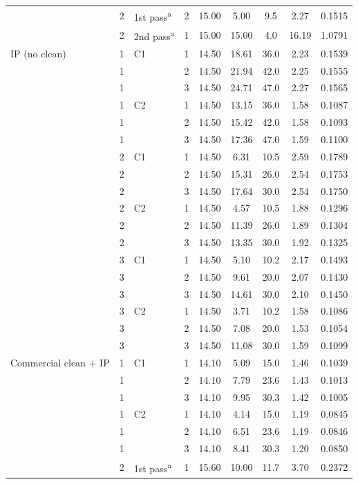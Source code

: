 {\begin{longtable}{>{\raggedright\arraybackslash}p{2.2cm}llcccccc}
    \addlinespace[2pt]
     & 2 & 1st pass\textsuperscript{a} & 2 & 15.00 & 5.00 & 9.5 & 2.27 & 0.1515 \\
    \addlinespace[2pt]
     & 2 & 2nd pass\textsuperscript{a} & 1 & 15.00 & 15.00 & 4.0 & 16.19 & 1.0791 \\
    \midrule
    IP (no clean) & 1 & C1 & 1 & 14.50 & 18.61 & 36.0 & 2.23 & 0.1539 \\
     & 1 &  & 2 & 14.50 & 21.94 & 42.0 & 2.25 & 0.1555 \\
     & 1 &  & 3 & 14.50 & 24.71 & 47.0 & 2.27 & 0.1565 \\
    \addlinespace[2pt]
     & 1 & C2 & 1 & 14.50 & 13.15 & 36.0 & 1.58 & 0.1087 \\
     & 1 &  & 2 & 14.50 & 15.42 & 42.0 & 1.58 & 0.1093 \\
     & 1 &  & 3 & 14.50 & 17.36 & 47.0 & 1.59 & 0.1100 \\
    \addlinespace[2pt]
     & 2 & C1 & 1 & 14.50 & 6.31 & 10.5 & 2.59 & 0.1789 \\
     & 2 &  & 2 & 14.50 & 15.31 & 26.0 & 2.54 & 0.1753 \\
     & 2 &  & 3 & 14.50 & 17.64 & 30.0 & 2.54 & 0.1750 \\
    \addlinespace[2pt]
     & 2 & C2 & 1 & 14.50 & 4.57 & 10.5 & 1.88 & 0.1296 \\
     & 2 &  & 2 & 14.50 & 11.39 & 26.0 & 1.89 & 0.1304 \\
     & 2 &  & 3 & 14.50 & 13.35 & 30.0 & 1.92 & 0.1325 \\
    \addlinespace[2pt]
     & 3 & C1 & 1 & 14.50 & 5.10 & 10.2 & 2.17 & 0.1493 \\
     & 3 &  & 2 & 14.50 & 9.61 & 20.0 & 2.07 & 0.1430 \\
     & 3 &  & 3 & 14.50 & 14.61 & 30.0 & 2.10 & 0.1450 \\
    \addlinespace[2pt]
     & 3 & C2 & 1 & 14.50 & 3.71 & 10.2 & 1.58 & 0.1086 \\
     & 3 &  & 2 & 14.50 & 7.08 & 20.0 & 1.53 & 0.1054 \\
     & 3 &  & 3 & 14.50 & 11.08 & 30.0 & 1.59 & 0.1099 \\
    \midrule
    Commercial clean + IP & 1 & C1 & 1 & 14.10 & 5.09 & 15.0 & 1.46 & 0.1039 \\
     & 1 &  & 2 & 14.10 & 7.79 & 23.6 & 1.43 & 0.1013 \\
     & 1 &  & 3 & 14.10 & 9.95 & 30.3 & 1.42 & 0.1005 \\
    \addlinespace[2pt]
     & 1 & C2 & 1 & 14.10 & 4.14 & 15.0 & 1.19 & 0.0845 \\
     & 1 &  & 2 & 14.10 & 6.51 & 23.6 & 1.19 & 0.0846 \\
     & 1 &  & 3 & 14.10 & 8.41 & 30.3 & 1.20 & 0.0850 \\
    \addlinespace[2pt]
     & 2 & 1st pass\textsuperscript{a} & 1 & 15.60 & 10.00 & 11.7 & 3.70 & 0.2372 \\
  \bottomrule
\end{longtable}}

